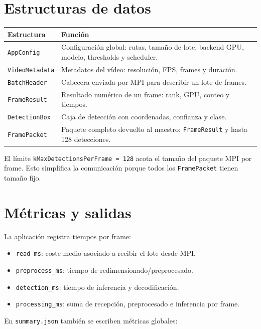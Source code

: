 \documentclass[12pt,a4paper]{article}
\begin{document}
\section{Estructuras de datos}

\begin{longtable}{p{}p{}}
\toprule
\textbf{Estructura} & \textbf{Funci\'on} \\
\midrule
\texttt{AppConfig} & Configuraci\'on global: rutas, tama\~no de lote, backend GPU, modelo, thresholds y scheduler. \\
\texttt{VideoMetadata} & Metadatos del v\'ideo: resoluci\'on, FPS, frames y duraci\'on. \\
\texttt{BatchHeader} & Cabecera enviada por MPI para describir un lote de frames. \\
\texttt{FrameResult} & Resultado num\'erico de un frame: rank, GPU, conteo y tiempos. \\
\texttt{DetectionBox} & Caja de detecci\'on con coordenadas, confianza y clase. \\
\texttt{FramePacket} & Paquete completo devuelto al maestro: \texttt{FrameResult} y hasta 128 detecciones. \\
\bottomrule
\end{longtable}

El l\'imite \texttt{kMaxDetectionsPerFrame = 128} acota el tama\~no del paquete MPI por frame.
Esto simplifica la comunicaci\'on porque todos los \texttt{FramePacket} tienen tama\~no fijo.

\section{M\'etricas y salidas}

La aplicaci\'on registra tiempos por frame:

\begin{itemize}
    \item \texttt{read\_ms}: coste medio asociado a recibir el lote desde MPI.
    \item \texttt{preprocess\_ms}: tiempo de redimensionado/preprocesado.
    \item \texttt{detection\_ms}: tiempo de inferencia y decodificaci\'on.
    \item \texttt{processing\_ms}: suma de recepci\'on, preprocesado e inferencia por frame.
\end{itemize}

En \texttt{summary.json} tambi\'en se escriben m\'etricas globales:
\end{document}
